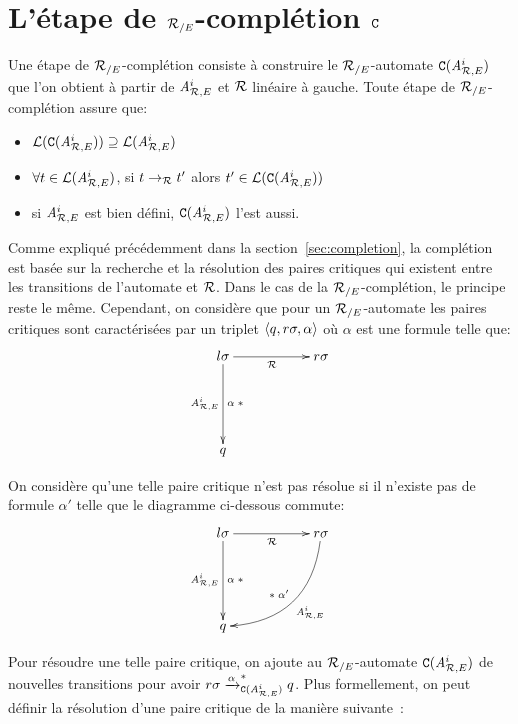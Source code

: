 
\section{L'étape de ${\mathcal R_{/E}}$-complétion $\mathtt{C}$}

Une étape de ${\mathcal R_{/E}}$-complétion consiste à construire le ${\mathcal R_{/E}}$-automate $\mathtt{C}({\mathit A}_{\mathcal R,E}^i)$ 
que l'on obtient à partir de ${\mathit A}_{\mathcal R,E}^i$ et $\mathcal R$ linéaire à gauche.
Toute étape de ${\mathcal R_{/E}}$-complétion assure que:

\begin{itemize}
\item $\mathcal{L}(\mathtt{C}({\mathit A}_{\mathcal R,E}^i)) \supseteq \mathcal{L}({\mathit A}_{\mathcal R,E}^i)$
\item $\forall t \in \mathcal{L}({\mathit A}_{\mathcal R,E}^i)$, si $t \rightarrow_\mathcal R t'$ alors $t' \in \mathcal{L}(\mathtt{C}({\mathit A}_{\mathcal R,E}^i))$
\item si ${\mathit A}_{\mathcal R,E}^i$ est bien défini, $\mathtt{C}({\mathit A}_{\mathcal R,E}^i)$ l'est aussi.
\end{itemize}


Comme expliqué précédemment dans la section~\ref{sec:completion}, la complétion est basée sur
la recherche et la résolution des paires critiques qui existent entre les transitions de l'automate 
et $\mathcal R$. Dans le cas de la ${\mathcal R_{/E}}$-complétion, le principe reste le même. Cependant, on considère
que pour un ${\mathcal R_{/E}}$-automate les paires critiques sont caractérisées par un triplet $\langle q, r\sigma, \alpha\rangle$
où $\alpha$ est une formule telle que:
  \[
  \xymatrix{
    l\sigma \ar[dd]_{\aaexeq^i}^{\alpha\; *} \ar[rr]_{\R} && r\sigma\\
    \\
    q
  }
  \]

On considère qu'une telle paire critique n'est pas résolue si il n'existe pas de formule $\alpha'$ telle que 
le diagramme ci-dessous commute:
  \[
  \xymatrix{
    l\sigma \ar[dd]_{\aaexeq^i}^{\alpha\; *} \ar[rr]_{\R} && r\sigma \ar@/^1.8pc/[ddll]_{*\; \alpha'}^{\aaexeq^i}\\
    \\
    q
  }
  \]

Pour résoudre une telle paire critique, on ajoute au ${\mathcal R_{/E}}$-automate $\mathtt{C}({\mathit A}_{\mathcal R,E}^i)$
de nouvelles transitions pour avoir $r\sigma \xrightarrow{\alpha}_{\mathtt{C}({\mathit A}_{\mathcal R,E}^{i})}^* q$.
Plus formellement, on peut définir la résolution d'une paire critique de la manière suivante~:


